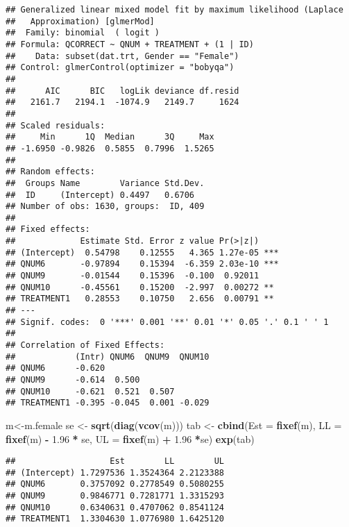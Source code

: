 \documentclass[]{article}
\newenvironment{Shaded}{\begin{snugshade}}{\end{snugshade}}
\newcommand{\KeywordTok}[1]{\textcolor[rgb]{0.13,0.29,0.53}{\textbf{#1}}}
\newcommand{\DataTypeTok}[1]{\textcolor[rgb]{0.13,0.29,0.53}{#1}}
\newcommand{\FloatTok}[1]{\textcolor[rgb]{0.00,0.00,0.81}{#1}}
\newcommand{\StringTok}[1]{\textcolor[rgb]{0.31,0.60,0.02}{#1}}
\newcommand{\OperatorTok}[1]{\textcolor[rgb]{0.81,0.36,0.00}{\textbf{#1}}}
\newcommand{\NormalTok}[1]{#1}
\begin{document}
\begin{verbatim}
## Generalized linear mixed model fit by maximum likelihood (Laplace
##   Approximation) [glmerMod]
##  Family: binomial  ( logit )
## Formula: QCORRECT ~ QNUM + TREATMENT + (1 | ID)
##    Data: subset(dat.trt, Gender == "Female")
## Control: glmerControl(optimizer = "bobyqa")
## 
##      AIC      BIC   logLik deviance df.resid 
##   2161.7   2194.1  -1074.9   2149.7     1624 
## 
## Scaled residuals: 
##     Min      1Q  Median      3Q     Max 
## -1.6950 -0.9826  0.5855  0.7996  1.5265 
## 
## Random effects:
##  Groups Name        Variance Std.Dev.
##  ID     (Intercept) 0.4497   0.6706  
## Number of obs: 1630, groups:  ID, 409
## 
## Fixed effects:
##             Estimate Std. Error z value Pr(>|z|)    
## (Intercept)  0.54798    0.12555   4.365 1.27e-05 ***
## QNUM6       -0.97894    0.15394  -6.359 2.03e-10 ***
## QNUM9       -0.01544    0.15396  -0.100  0.92011    
## QNUM10      -0.45561    0.15200  -2.997  0.00272 ** 
## TREATMENT1   0.28553    0.10750   2.656  0.00791 ** 
## ---
## Signif. codes:  0 '***' 0.001 '**' 0.01 '*' 0.05 '.' 0.1 ' ' 1
## 
## Correlation of Fixed Effects:
##            (Intr) QNUM6  QNUM9  QNUM10
## QNUM6      -0.620                     
## QNUM9      -0.614  0.500              
## QNUM10     -0.621  0.521  0.507       
## TREATMENT1 -0.395 -0.045  0.001 -0.029
\end{verbatim}

\begin{Shaded}
\begin{Highlighting}[]
\NormalTok{m<-m.female}
\NormalTok{se <-}\StringTok{ }\KeywordTok{sqrt}\NormalTok{(}\KeywordTok{diag}\NormalTok{(}\KeywordTok{vcov}\NormalTok{(m)))}
\NormalTok{tab <-}\StringTok{ }\KeywordTok{cbind}\NormalTok{(}\DataTypeTok{Est =} \KeywordTok{fixef}\NormalTok{(m), }\DataTypeTok{LL =} \KeywordTok{fixef}\NormalTok{(m) }\OperatorTok{-}\StringTok{ }\FloatTok{1.96} \OperatorTok{*}\StringTok{ }\NormalTok{se, }\DataTypeTok{UL =} \KeywordTok{fixef}\NormalTok{(m) }\OperatorTok{+}\StringTok{ }\FloatTok{1.96} \OperatorTok{*}\NormalTok{se)}
\KeywordTok{exp}\NormalTok{(tab)}
\end{Highlighting}
\end{Shaded}

\begin{verbatim}
##                   Est        LL        UL
## (Intercept) 1.7297536 1.3524364 2.2123388
## QNUM6       0.3757092 0.2778549 0.5080255
## QNUM9       0.9846771 0.7281771 1.3315293
## QNUM10      0.6340631 0.4707062 0.8541124
## TREATMENT1  1.3304630 1.0776980 1.6425120
\end{verbatim}
\end{document}
